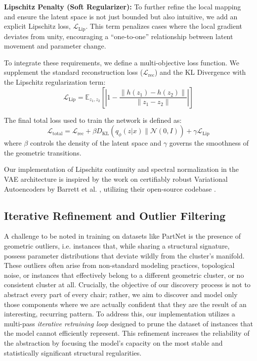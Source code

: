\documentclass{thesis}
\begin{document}
\textbf{Lipschitz Penalty (Soft Regularizer):} To further refine the local mapping and ensure the latent space is not just bounded but also intuitive, we add an explicit Lipschitz loss, $\mathcal{L}_{\text{Lip}}$. This term penalizes cases where the local gradient deviates from unity, encouraging a ``one-to-one'' relationship between latent movement and parameter change. 

To integrate these requirements, we define a multi-objective loss function. We supplement the standard reconstruction loss ($\mathcal{L}_{\text{rec}}$) and the KL Divergence with the Lipschitz regularization term:
\begin{equation}
\mathcal{L}_{\text{Lip}} = \mathbb{E}_{z_1, z_2} \left[ \left| 1 - \frac{\|h(z_1) - h(z_2)\|}{\|z_1 - z_2\|} \right| \right]
\end{equation}

The final total loss used to train the network is defined as:
\begin{equation}
\mathcal{L}_{\text{total}} = \mathcal{L}_{\text{rec}} + \beta D_{\text{KL}}(q_\phi(z|x) \| \mathcal{N}(0, I)) + \gamma \mathcal{L}_{\text{Lip}}
\end{equation}
where $\beta$ controls the density of the latent space and $\gamma$ governs the smoothness of the geometric transitions.

Our implementation of Lipschitz continuity and spectral normalization in the VAE architecture is inspired by the work on certifiably robust Variational Autoencoders by Barrett et al. \cite{Barrett2021}, utilizing their open-source codebase \cite{Barrett_Lipschitz_VAEs}.

\subsection{Iterative Refinement and Outlier Filtering}

A challenge to be noted in training on datasets like PartNet is the presence of geometric outliers, i.e. instances that, while sharing a structural signature, possess parameter distributions that deviate wildly from the cluster's manifold. These outliers often arise from non-standard modeling practices, topological noise, or instances that effectively belong to a different geometric cluster, or no consistent cluster at all. Crucially, the objective of our discovery process is not to abstract every part of every chair; rather, we aim to discover and model only those components where we are actually confident that they are the result of an interesting, recurring pattern. To address this, our implementation utilizes a multi-pass \textit{iterative retraining loop} designed to prune the dataset of instances that the model cannot efficiently represent. This refinement increases the reliability of the abstraction by focusing the model's capacity on the most stable and statistically significant structural regularities.
\end{document}
